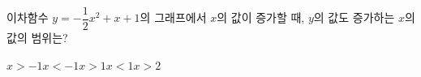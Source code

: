 이차함수 $y=-\dfrac{1}{2}x^2+x+1$의 그래프에서 $x$의 값이 증가할 때, $y$의 값도 증가하는 $x$의 값의 범위는?
\begin{choices32}{$x>-1$}{$x<-1$}{$x>1$}{$x<1$}{$x>2$}\end{choices32}
